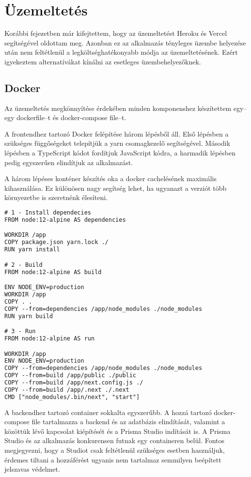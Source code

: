 \chapter{Üzemeltetés}
Korábbi fejezetben már kifejtettem, hogy az üzemeltetést Heroku és Vercel segítségével oldottam meg.
Azonban ez az alkalmazás tényleges üzembe helyezése után nem feltétlenül a legköltséghatékonyabb módja az üzemeltetésének.
Ezért igyekeztem alternatívákat kínálni az esetleges üzembehelyezőknek.

\section{Docker}
Az üzemeltetés megkönnyítése érdekében minden komponenshez készítettem egy–egy dockerfile–t és docker-compose file–t.

A frontendhez tartozó Docker felépítése három lépésből áll. Első lépésben a szükséges függőségeket telepítjük a yarn csomagkezelő segítségével.
Második lépésben a TypeScript kódot fordítjuk JavaScript kódra, a harmadik lépésben pedig egyszerűen elindítjuk az alkalmazást.

A három lépéses konténer készítés oka a docker cachelésének maximális kihasználása.
Ez különösen nagy segítség lehet, ha ugyanazt a verziót több környezetbe is szeretnénk élesíteni.

\begin{lstlisting}[language=TeX]
# 1 - Install dependecies
FROM node:12-alpine AS dependencies

WORKDIR /app
COPY package.json yarn.lock ./
RUN yarn install

# 2 - Build
FROM node:12-alpine AS build

ENV NODE_ENV=production
WORKDIR /app
COPY . .
COPY --from=dependencies /app/node_modules ./node_modules
RUN yarn build

# 3 - Run
FROM node:12-alpine AS run

WORKDIR /app
ENV NODE_ENV=production
COPY --from=dependencies /app/node_modules ./node_modules
COPY --from=build /app/public ./public
COPY --from=build /app/next.config.js ./
COPY --from=build /app/.next ./.next
CMD ["node_modules/.bin/next", "start"]
\end{lstlisting}

A backendhez tartozó container sokkalta egyszerűbb. 
A hozzá tartozó docker-compose file tartalmazza a backend és az adatbázis elindítását, valamint a közöttük lévő kapcsolat kiépítését és a Prisma Studio indítását is.
A Prisma Studio és az alkalmazás konkurensen futnak egy containeren belül.
Fontos megjegyezni, hogy a Studiot csak feltétlenül szükséges esetben használjuk, érdemes tiltani a hozzáférést ugyanis nem tartalmaz semmilyen beépített jelszavas védelmet.

